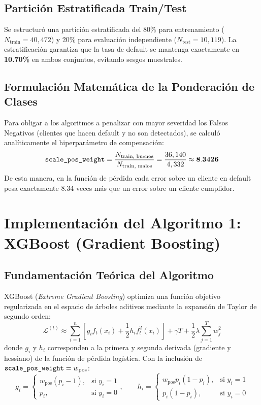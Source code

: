 \documentclass[11pt,a4paper]{article}
\begin{document}
\subsection{Partición Estratificada Train/Test}
Se estructuró una partición estratificada del 80\% para entrenamiento ($N_{\text{train}} = 40,472$) y 20\% para evaluación independiente ($N_{\text{test}} = 10,119$). La estratificación garantiza que la tasa de default se mantenga exactamente en \textbf{10.70\%} en ambos conjuntos, evitando sesgos muestrales.

\subsection{Formulación Matemática de la Ponderación de Clases}
Para obligar a los algoritmos a penalizar con mayor severidad los Falsos Negativos (clientes que hacen default y no son detectados), se calculó analíticamente el hiperparámetro de compensación:
\begin{equation}
\text{\texttt{scale\_pos\_weight}} = \frac{N_{\text{train, buenos}}}{N_{\text{train, malos}}} = \frac{36,140}{4,332} \approx \mathbf{8.3426}
\end{equation}
De esta manera, en la función de pérdida cada error sobre un cliente en default pesa exactamente 8.34 veces más que un error sobre un cliente cumplidor.

\section{Implementación del Algoritmo 1: XGBoost (Gradient Boosting)}

\subsection{Fundamentación Teórica del Algoritmo}
XGBoost (\textit{Extreme Gradient Boosting}) optimiza una función objetivo regularizada en el espacio de árboles aditivos mediante la expansión de Taylor de segundo orden:
\begin{equation}
\mathcal{L}^{(t)} \approx \sum_{i=1}^n \left[ g_i f_t(x_i) + \frac{1}{2} h_i f_t^2(x_i) \right] + \gamma T + \frac{1}{2}\lambda \sum_{j=1}^T w_j^2
\end{equation}
donde $g_i$ y $h_i$ corresponden a la primera y segunda derivada (gradiente y hessiano) de la función de pérdida logística. Con la inclusión de $\text{\texttt{scale\_pos\_weight}} = w_{\text{pos}}$:
\begin{equation}
g_i = 
\begin{cases} 
w_{\text{pos}}(p_i - 1), & \text{si } y_i = 1 \\
p_i, & \text{si } y_i = 0
\end{cases}, \qquad
h_i = 
\begin{cases} 
w_{\text{pos}} p_i(1 - p_i), & \text{si } y_i = 1 \\
p_i(1 - p_i), & \text{si } y_i = 0
\end{cases}
\end{equation}
\end{document}
